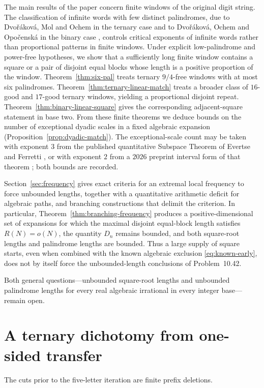 \documentclass[11pt,reqno,a4paper]{amsart}
\theoremstyle{remark}
\begin{document}
The main results of the paper concern finite windows of the original digit string. The classification of infinite words with few distinct palindromes, due to Dvo\v r\'akov\'a, Mol and Ochem in the ternary case \cite{DMO} and to Dvo\v r\'akov\'a, Ochem and Opo\v censk\'a in the binary case \cite{DOO}, controls critical exponents of infinite words rather than proportional patterns in finite windows. Under explicit low-palindrome and power-free hypotheses, we show that a sufficiently long finite window contains a square or a pair of disjoint equal blocks whose length is a positive proportion of the window. Theorem~\ref{thm:six-pal} treats ternary $9/4$-free windows with at most six palindromes. Theorem~\ref{thm:ternary-linear-match} treats a broader class of $16$-good and $17$-good ternary windows, yielding a proportional disjoint repeat. Theorem~\ref{thm:binary-linear-square} gives the corresponding adjacent-square statement in base two. From these finite theorems we deduce bounds on the number of exceptional dyadic scales in a fixed algebraic expansion (Proposition~\ref{prop:dyadic-match}). The exceptional-scale count may be taken with exponent $3$ from the published quantitative Subspace Theorem of Evertse and Ferretti \cite{EF}, or with exponent $2$ from a $2026$ preprint interval form of that theorem \cite{Stephan}; both bounds are recorded.

Section~\ref{sec:frequency} gives exact criteria for an extremal local frequency to force unbounded lengths, together with a quantitative arithmetic deficit for algebraic paths, and branching constructions that delimit the criterion. In particular, Theorem~\ref{thm:branching-frequency} produces a positive-dimensional set of expansions for which the maximal disjoint equal-block length satisfies $R(N)=o(N)$, the quantity $D_n$ remains bounded, and both square-root lengths and palindrome lengths are bounded. Thus a large supply of square starts, even when combined with the known algebraic exclusion \eqref{eq:known-early}, does not by itself force the unbounded-length conclusions of Problem~10.42.

Both general questions---unbounded square-root lengths and unbounded palindrome lengths for every real algebraic irrational in every integer base---remain open.

\section{A ternary dichotomy from one-sided transfer}\label{sec:ternary}
The cuts prior to the five-letter iteration are finite prefix deletions.






\end{document}
